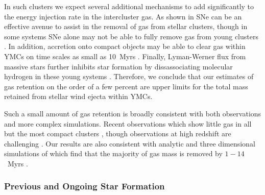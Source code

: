 \documentclass[fleqn,usenatbib]{mnras}
\begin{document}
 In such clusters we expect several additional mechanisms to add significantly to the energy injection rate in the intercluster gas.
 As shown in \cite{calura2015} SNe can be an effective avenue to assist in the removal of gas from stellar clusters, though in some systems SNe alone may not be able to fully remove gas from young clusters \citep{krause2013}.
 In addition, accretion onto compact objects may be able to clear gas within YMCs on time scales as small as 10~Myrs \citep{leigh2013a}.
 Finally, Lyman-Werner flux from massive stars further inhibits star formation by dissassociating molecular hydrogen in these young systems \citep{ten1986,conroy2011b,krause2013}.
 Therefore, we conclude that our estimates of gas retention on the order of a few percent are upper limits for the total mass retained from stellar wind ejecta within YMCs.

 Such a small amount of gas retention is broadly consistent with both observations and more complex simulations.
 Recent observations which show little gas in all but the most compact clusters \citep{bastian2014a,cabrera2015,krui2015,longmore2015}, though observations at high redshift are challenging \citep{longmore2015}.
 Our results are also consistent with analytic and three dimensional simulations of  which find that the majority of gas mass is removed by $1-14$~Myrs \citep{calura2015,krui2015}.


\subsubsection{Previous and Ongoing Star Formation} \label{section:YMCongoing}
\end{document}
